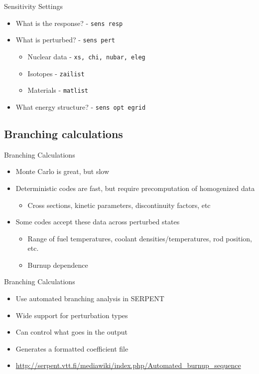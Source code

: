 \documentclass{beamer}
\begin{document}
\begin{frame}{Sensitivity Settings}
    \begin{itemize}
        \item{What is the response? - \texttt{sens resp}}
        \item{What is perturbed? - \texttt{sens pert}}
        \begin{itemize}
            \item{Nuclear data - \texttt{xs, chi, nubar, eleg}}
            \item{Isotopes - \texttt{zailist}}
            \item{Materials - \texttt{matlist}}
        \end{itemize}
        \item{What energy structure? - \texttt{sens opt egrid}}
    \end{itemize}
\end{frame}

\subsection{Branching calculations}

\begin{frame}{Branching Calculations}
    \begin{itemize}
        \item{Monte Carlo is great, but slow}
        \item{Deterministic codes are fast, but require precomputation of homogenized data}
        \begin{itemize}
            \item{Cross sections, kinetic parameters, discontinuity factors, etc}
        \end{itemize}
        \item{Some codes accept these data across perturbed states}
        \begin{itemize}
            \item{Range of fuel temperatures, coolant densities/temperatures, rod position, etc.}
            \item{Burnup dependence}
        \end{itemize}
    \end{itemize}
\end{frame}

\begin{frame}{Branching Calculations}
    \begin{itemize}
        \item{Use automated branching analysis in SERPENT}
        \item{Wide support for perturbation types}
        \item{Can control what goes in the output}
        \item{Generates a formatted coefficient file}
        \item{\url{http://serpent.vtt.fi/mediawiki/index.php/Automated\_burnup\_sequence}}
    \end{itemize}
\end{frame}
\end{document}
